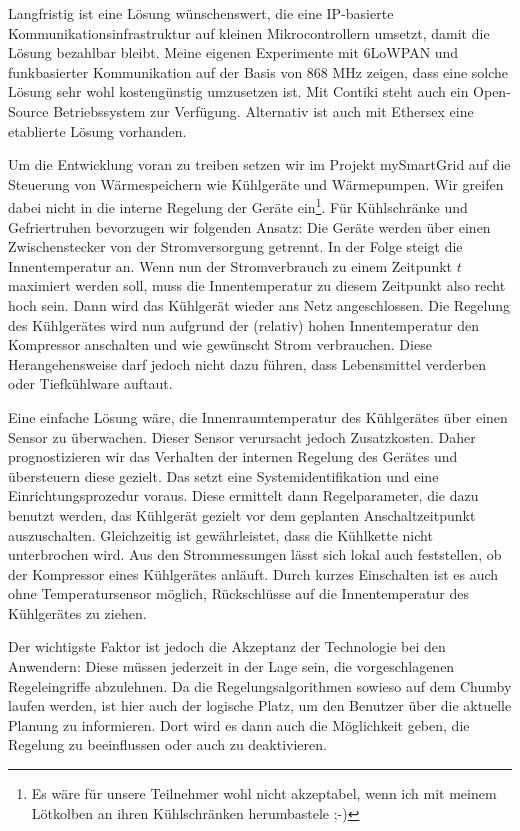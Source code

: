 \documentclass[12pt,BCOR=8.5mm]{scrartcl}
\begin{document}
Langfristig ist eine Lösung wünschenswert, die eine IP-basierte
Kommunikationsinfrastruktur auf kleinen Mikrocontrollern umsetzt, damit
die Lösung bezahlbar bleibt. Meine eigenen Experimente mit 6LoWPAN und
funkbasierter Kommunikation auf der Basis von 868 MHz zeigen, dass eine
solche Lösung sehr wohl kostengünstig umzusetzen ist. Mit Contiki  steht auch ein Open-Source
Betriebssystem zur Verfügung. Alternativ ist auch mit Ethersex
 eine etablierte Lösung vorhanden. 

Um die Entwicklung voran zu treiben setzen wir im Projekt mySmartGrid
auf die Steuerung von Wärmespeichern wie Kühlgeräte und Wärmepumpen. Wir
greifen dabei nicht in die interne Regelung der Geräte
ein\footnote{Es wäre für unsere Teilnehmer wohl nicht akzeptabel, wenn
ich mit meinem Lötkolben an ihren Kühlschränken herumbastele ;-)}. Für
Kühlschränke und Gefriertruhen bevorzugen wir folgenden Ansatz: Die
Geräte werden über einen Zwischenstecker von der Stromversorgung
getrennt. In der Folge steigt die Innentemperatur an. Wenn nun der
Stromverbrauch zu einem Zeitpunkt $t$ maximiert werden soll, muss die
Innentemperatur zu diesem Zeitpunkt also recht hoch sein. Dann wird das
Kühlgerät wieder ans Netz angeschlossen. Die Regelung des Kühlgerätes
wird nun aufgrund der (relativ) hohen Innentemperatur den Kompressor
anschalten und wie gewünscht Strom verbrauchen. Diese Herangehensweise
darf jedoch nicht dazu führen, dass Lebensmittel verderben oder
Tiefkühlware auftaut.

Eine einfache Lösung wäre, die Innenraumtemperatur des Kühlgerätes über
einen Sensor zu überwachen. Dieser Sensor verursacht jedoch
Zusatzkosten. Daher prognostizieren wir das Verhalten der internen
Regelung des Gerätes und übersteuern diese gezielt. Das setzt eine
Systemidentifikation und eine Einrichtungsprozedur voraus. Diese
ermittelt dann Regelparameter, die dazu benutzt werden, das Kühlgerät
gezielt vor dem geplanten Anschaltzeitpunkt auszuschalten. Gleichzeitig
ist gewährleistet, dass die Kühlkette nicht unterbrochen wird. Aus den
Strommessungen lässt sich lokal auch feststellen, ob der Kompressor
eines Kühlgerätes anläuft. Durch kurzes Einschalten ist es auch ohne
Temperatursensor möglich, Rückschlüsse auf die Innentemperatur des
Kühlgerätes zu ziehen.


Der wichtigste Faktor ist jedoch die Akzeptanz der Technologie bei den
Anwendern: Diese müssen jederzeit in der Lage sein, die vorgeschlagenen
Regeleingriffe abzulehnen. Da die Regelungsalgorithmen sowieso auf dem
Chumby laufen werden, ist hier auch der logische Platz, um den Benutzer
über die aktuelle Planung zu informieren. Dort wird es dann auch die
Möglichkeit geben, die Regelung zu beeinflussen oder auch zu
deaktivieren.
\end{document}
